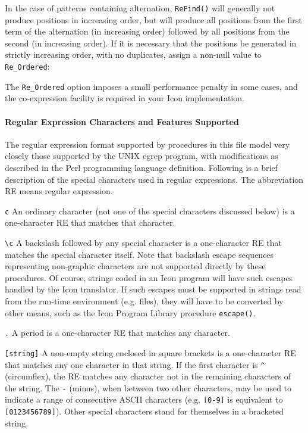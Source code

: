 
In the case of patterns containing alternation, \texttt{ReFind()} will
generally not produce positions in increasing order, but will produce
all positions from the first term of the alternation (in increasing
order) followed by all positions from the second (in increasing order).
If it is necessary that the positions be generated in strictly
increasing order, with no duplicates, assign a non-null value to
\texttt{Re\_Ordered}:


The \texttt{Re\_Ordered} option imposes a small performance penalty in
some cases, and the co-expression facility is required in your Icon
implementation.

\paragraph{Regular Expression Characters and Features Supported}
The regular expression format supported by procedures in this file model
very closely those supported by the UNIX
{\textquotedbl}egrep{\textquotedbl} program, with modifications as
described in the Perl programming language definition. Following is a
brief description of the special characters used in regular
expressions. The abbreviation RE means regular expression.

\texttt{c} An ordinary character (not one of the special characters
discussed below) is a one-character RE that matches that character.

\texttt{{\textbackslash}c} A backslash followed by any special character
is a one-character RE that matches the special character itself. Note
that backslash escape sequences representing non-graphic characters are
not supported directly by these procedures. Of course, strings coded in
an Icon program will have such escapes handled by the Icon translator.
If such escapes must be supported in strings read from the run-time
environment (e.g. files), they will have to be converted by other
means, such as the Icon Program Library procedure \texttt{escape()}.

\texttt{.} A period is a one-character RE that matches any character.

\texttt{[string]} A non-empty string enclosed in square brackets is a
one-character RE that matches any one character in that string. If the
first character is \texttt{{\textquotedbl}\^{}{\textquotedbl}}
(circumflex), the RE matches any character not in the remaining
characters of the string. The \texttt{{\textquotedbl}-{\textquotedbl}}
(minus), when between two other characters, may be used to indicate a
range of consecutive ASCII characters (e.g. \texttt{[0-9]}
is equivalent to \texttt{[0123456789]}). Other special characters stand
for themselves in a bracketed string.


